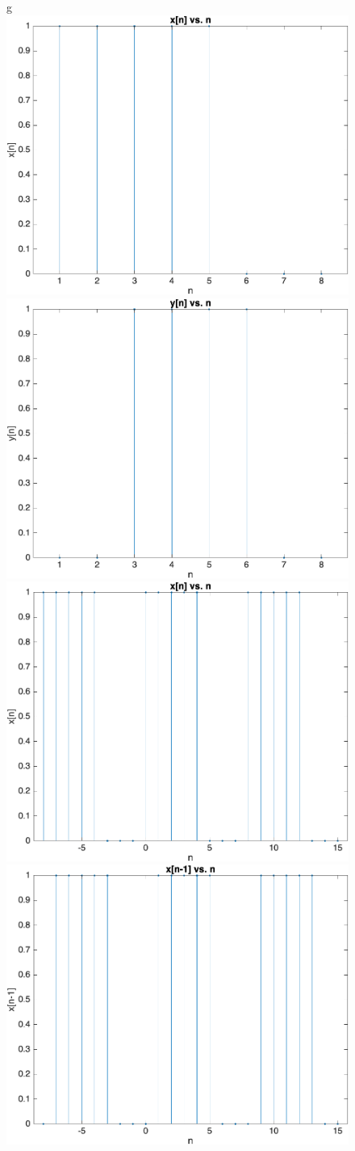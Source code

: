 \documentclass[12pt]{article}
\begin{document}
\begin{enumerate}[label=\textbf{\alph*)}, leftmargin=2.6em]
\begin{figure} [H]
g
    \includegraphics[width=0.32\linewidth]{20.png} \includegraphics[width=0.32\linewidth]{21.png}    \includegraphics[width=0.32\linewidth]{22.png} \includegraphics[width=0.32\linewidth]{23.png} \inc
\end{figure}
\end{enumerate}
\end{document}
